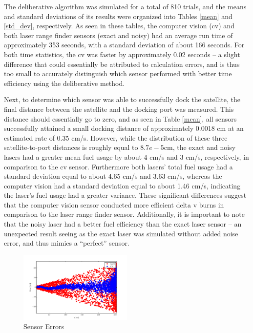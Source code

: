 \documentclass[journal, 10pt]{IEEEtran}
\begin{document}
The deliberative algorithm was simulated for a total of 810 trials, and the means and standard deviations of its results were organized into Tables \ref{mean} and \ref{std_dev}, respectively. As seen in these tables, the computer vision (cv) and both laser range finder sensors (exact and noisy) had an average run time of approximately 353 seconds, with a standard deviation of about 166 seconds. For both time statistics, the cv was faster by approximately 0.02 seconds -- a slight difference that could essentially be attributed to calculation errors, and is thus too small to accurately distinguish which sensor performed with better time efficiency using the deliberative method. 

Next, to determine which sensor was able to successfully dock the satellite, the final distance between the satellite and the docking port was measured. This distance should essentially go to zero, and as seen in Table \ref{mean}, all sensors successfully attained a small docking distance of approximately 0.0018 cm at an estimated rate of 0.35 cm/s. However, while the distribution of these three satellite-to-port distances is roughly equal to $8.7e-5$cm, the exact and noisy lasers had a greater mean fuel usage by about 4 cm/s and 3 cm/s, respectively, in comparison to the cv sensor. Furthermore both lasers' total fuel usage had a standard deviation equal to about 4.65 cm/s and 3.63 cm/s, whereas the computer vision had a standard deviation equal to about 1.46 cm/s, indicating the laser's fuel usage had a greater variance. These significant differences suggest that the computer vision sensor conducted more efficient delta v burns in comparison to the laser range finder sensor. Additionally, it is important to note that the noisy laser had a better fuel efficiency than the exact laser sensor -- an unexpected result seeing as the exact laser was simulated without added noise error, and thus mimics a ``perfect'' sensor. 

 \begin{figure}
\begin{center}
\includegraphics[width=0.5\textwidth]{figures/SensorErrors.pdf}
\caption{Sensor Errors}
\label{error}
\end{center}
\end{figure}
\end{document}
